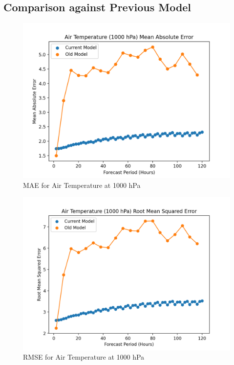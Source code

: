 \begin{appendices}
    \section{Comparison against Previous Model}\label{old_model}
    \begin{figure}[H]
        \centering
        \includegraphics[width=.7\linewidth]{Plots/Results/Temperature/t1000_mae.png}
        \caption{MAE for Air Temperature at 1000 hPa}
    \end{figure}
    
    \begin{figure}[H]
        \centering
        \includegraphics[width=.7\linewidth]{Plots/Results/Temperature/t1000_rmse.png}
        \caption{RMSE for Air Temperature at 1000 hPa}
    \end{figure}
\end{appendices}